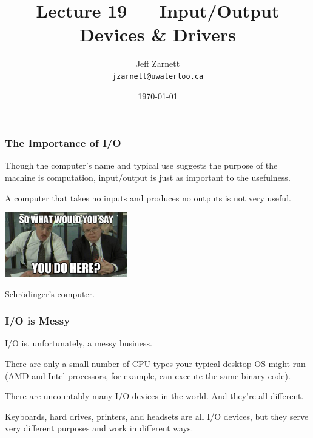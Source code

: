 

\title{Lecture 19 --- Input/Output Devices \& Drivers }

\author{Jeff Zarnett \\ \small \texttt{jzarnett@uwaterloo.ca}}
\date{\today}




\begin{frame}
  \titlepage

 \end{frame}




\begin{frame}
\frametitle{The Importance of I/O}

Though the computer's name and typical use suggests the purpose of the machine is computation, input/output is just as important to the usefulness. 

A computer that takes no inputs and produces no outputs is not very useful.

\begin{center}
	\includegraphics[width=0.4\textwidth]{images/whatyoudohere.jpg}
\end{center}

Schr\"odinger's computer.


\end{frame}

\begin{frame}
\frametitle{I/O is Messy}

I/O is, unfortunately, a messy business. 

There are only a small number of CPU types your typical desktop OS might run (AMD and Intel processors, for example, can execute the same binary code).

There are uncountably many I/O devices in the world. And they're all different. 

Keyboards, hard drives, printers, and headsets are all I/O devices, but they serve very different purposes and work in different ways.


\end{frame}

